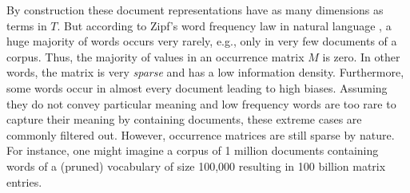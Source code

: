 By construction these document representations have as many dimensions as terms in $T$. But according to Zipf’s word frequency law in natural language \autocite{zipf_psychobiology_1935}, a huge majority of words occurs very rarely, e.g., only in very few documents of a corpus. Thus, the majority of values in an occurrence matrix $M$ is zero. In other words, the matrix is very \textit{sparse} and has a low information density. Furthermore, some words occur in almost every document leading to high biases. Assuming they do not convey particular meaning and low frequency words are too rare to capture their meaning by containing documents, these extreme cases are commonly filtered out. However, occurrence matrices are still sparse by nature. For instance, one might imagine a corpus of 1 million documents containing words of a (pruned) vocabulary of size 100,000 resulting in 100 billion matrix entries.

